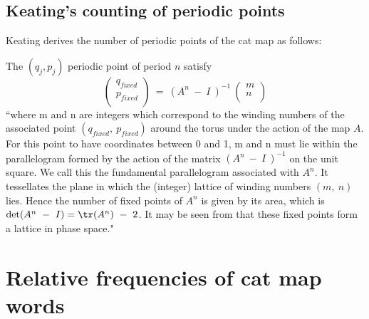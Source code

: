 \subsection{Keating's counting of periodic points}

Keating derives the number of periodic points of the cat
map as follows:

The $(q_j,p_j)$ periodic point of period $n$ satisfy
\begin{equation}
 \left (
		\begin{array}{c}
		q_{fixed}\\
		p_{fixed}\\
		\end{array} \right) \ = \ (A^n \ - \ I \ )^{-1} \
 \left (
		\begin{array}{c}
		m\\
		n\\
		\end{array} \right)
\label{FixedPointsEq}		
\end{equation}		
``where m and n are integers which correspond to the winding numbers of
the associated point $( q_{fixed},\ p_{fixed})$ around the torus under
the action of the map $A$. For this point to have coordinates between 0
and 1, m and n must lie within the parallelogram formed by the action of
the matrix $(A^n \ - \ I \ )^{-1}$ on the unit square. We call this the
fundamental parallelogram associated with $A^n$. It tessellates the plane
in which the (integer) lattice of winding numbers $(m,\ n)$ lies. Hence
the number of fixed points of $A^n$ is given by its area, which is
$\det(A^n \ - \ I ) = \tr(A^n)\ -\ 2$. It may be seen from
 that these fixed points form a lattice in phase
space."

\section{Relative frequencies of cat map words}


